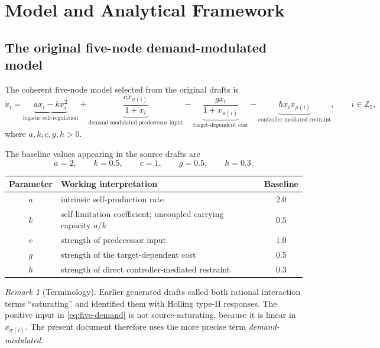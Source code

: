 \documentclass[11pt, reqno]{amsart}
\theoremstyle{definition}
\theoremstyle{remark}
\newtheorem{remark}[theorem]{Remark}
\newcommand{\Z}{\mathbb{Z}}
\begin{document}
\section{Model and Analytical Framework}
\label{sec:model}

\subsection{The original five-node demand-modulated model}

The coherent five-node model selected from the original drafts is
\begin{equation}
\label{eq:five-demand}
\dot{x}_i
=
\underbrace{a x_i-kx_i^2}_{\text{logistic self-regulation}}
+
\underbrace{\frac{c x_{\sigma(i)}}{1+x_i}}_{\text{demand-modulated predecessor input}}
-
\underbrace{\frac{g x_i}{1+x_{\kappa(i)}}}_{\text{target-dependent cost}}
-
\underbrace{h x_i x_{\rho(i)}}_{\text{controller-mediated restraint}},
\qquad i\in\Z_5,
\end{equation}
where $a,k,c,g,h>0$.

The baseline values appearing in the source drafts are
\begin{equation}
\label{eq:baseline-parameters}
    a=2,
    \qquad
    k=0.5,
    \qquad
    c=1,
    \qquad
    g=0.5,
    \qquad
    h=0.3.
\end{equation}

\begin{center}
\begin{tabular}{c p{9.2cm} c}
\toprule
Parameter & Working interpretation & Baseline \\
\midrule
$a$ & intrinsic self-production rate & $2.0$ \\
$k$ & self-limitation coefficient; uncoupled carrying capacity $a/k$ & $0.5$ \\
$c$ & strength of predecessor input & $1.0$ \\
$g$ & strength of the target-dependent cost & $0.5$ \\
$h$ & strength of direct controller-mediated restraint & $0.3$ \\
\bottomrule
\end{tabular}
\end{center}

\begin{remark}[Terminology]
Earlier generated drafts called both rational interaction terms ``saturating''
and identified them with Holling type-II responses.  The positive input in
\eqref{eq:five-demand} is not source-saturating, because it is linear in
$x_{\sigma(i)}$.  The present document therefore uses the more precise term
\emph{demand-modulated}.
\end{remark}
\end{document}
